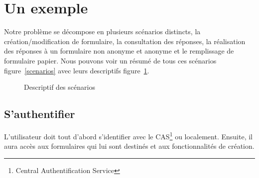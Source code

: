 \documentclass{sigplanconf}
\begin{document}
\section{Un exemple}\label{sec:scenarios}
Notre problème se décompose en plusieurs scénarios distincts, la création/modification de formulaire, la consultation des réponses, la réalisation des réponses à un formulaire non anonyme et anonyme et le remplissage de formulaire papier. Nous pouvons voir un résumé de tous ces scénarios figure~\ref{scenarios} avec leurs descriptifs figure~\ref{listScenarios}.
\begin{figure}
\begin{center}
\end{center}
\caption{Descriptif des scénarios}
\label{listScenarios}
\end{figure}

\subsection{S'authentifier}
L’utilisateur doit tout d’abord s'identifier avec le CAS\footnote{Central Authentification Service} ou localement. Ensuite, il aura accès aux formulaires qui lui sont destinés et aux fonctionnalités de création.
\end{document}
